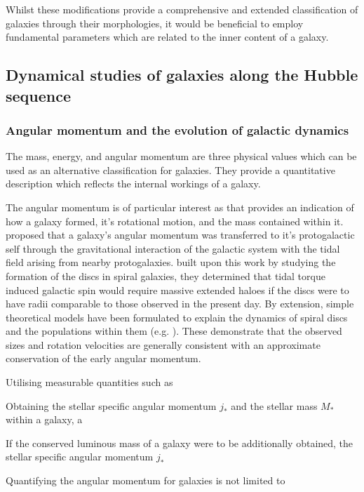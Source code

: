 \documentclass[12pt, twocolumn]{revtex4-1}    %
\begin{document}
Whilst these modifications provide a comprehensive and extended classification of galaxies through their morphologies, it would be beneficial to employ fundamental parameters which are related to the inner content of a galaxy.

\vspace{4ex}
\subsection{Dynamical studies of galaxies along the Hubble sequence}
\subsubsection{Angular momentum and the evolution of galactic dynamics}
\noindent
The mass, energy, and angular momentum are three physical values which can be used as an alternative classification for galaxies. They provide a quantitative description which reflects the internal workings of a galaxy.

The angular momentum is of particular interest as that provides an indication of how a galaxy formed, it's rotational motion, and the mass contained within it. \cite{1969ApJ...155..393P} proposed that a galaxy's angular momentum was transferred to it's protogalactic self through the gravitational interaction of the galactic system with the tidal field arising from nearby protogalaxies. \cite{1980MNRAS.193..189F} built upon this work by studying the formation of the discs in spiral galaxies, they determined that tidal torque induced galactic spin would require massive extended haloes if the discs were to have radii comparable to those observed in the present day. By extension, simple theoretical models have been formulated to explain the dynamics of spiral discs and the populations within them (e.g. \citealt{1998MNRAS.295..319M, 1997ApJ...482..659D}). These demonstrate that the observed sizes and rotation velocities are generally consistent with an approximate conservation of the early angular momentum. 

Utilising measurable quantities such as 

Obtaining the stellar specific angular momentum $j_*$ and the stellar mass $M_*$ within a galaxy, a 

If the conserved luminous mass of a galaxy were to be additionally obtained, the stellar specific angular momentum $j_*$

Quantifying the angular momentum for galaxies is not limited to 
\end{document}
